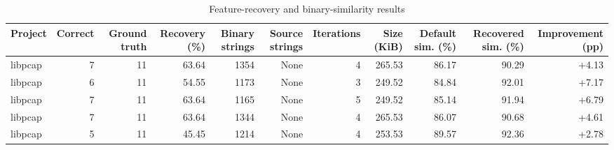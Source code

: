 \begin{table}[htbp]
\centering
\caption{Feature-recovery and binary-similarity results}
\label{tab:feature-recovery-results}
\small
\begin{tabular}{lrrrrrrrrrr}
\toprule
Project & Correct & Ground truth & Recovery (\%) & Binary strings & Source strings & Iterations & Size (KiB) & Default sim. (\%) & Recovered sim. (\%) & Improvement (pp) \\
\midrule
libpcap & 7 & 11 & 63.64 & 1354 & None & 4 & 265.53 & 86.17 & 90.29 & +4.13 \\
libpcap & 6 & 11 & 54.55 & 1173 & None & 3 & 249.52 & 84.84 & 92.01 & +7.17 \\
libpcap & 7 & 11 & 63.64 & 1165 & None & 5 & 249.52 & 85.14 & 91.94 & +6.79 \\
libpcap & 7 & 11 & 63.64 & 1344 & None & 4 & 265.53 & 86.07 & 90.68 & +4.61 \\
libpcap & 5 & 11 & 45.45 & 1214 & None & 4 & 253.53 & 89.57 & 92.36 & +2.78 \\
\bottomrule
\end{tabular}
\end{table}
